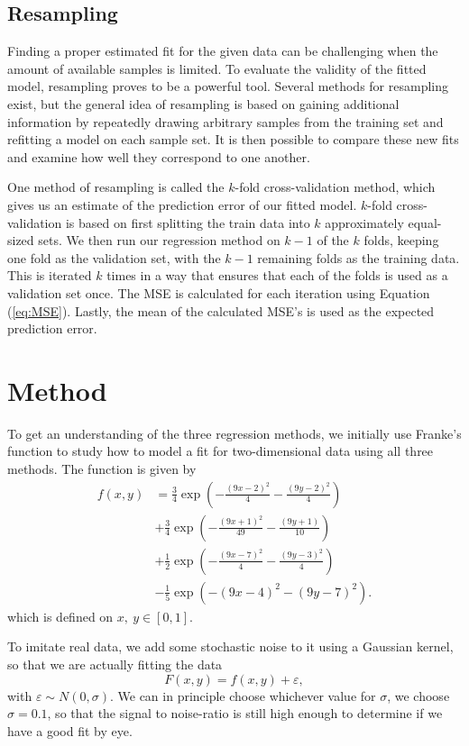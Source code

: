 \documentclass[a4paper, 10pt]{article}
\begin{document}
\begin{multicols}{2}
\subsection{Resampling}
Finding a proper estimated fit for the given data can be challenging when the amount of available samples is limited. To evaluate the validity of the fitted model, resampling proves to be a powerful tool. Several methods for resampling exist, but the general idea of resampling is based on gaining additional information by repeatedly drawing arbitrary samples from the training set and refitting a model on each sample set. It is then possible to compare these new fits and examine how well they correspond to one another.

One method of resampling is called the $k$-fold cross-validation method, which gives us an estimate of the prediction error of our fitted model. $k$-fold cross-validation is based on first splitting the train data into $k$ approximately equal-sized sets.  We then run our regression method on $k-1$ of the $k$ folds, keeping one fold as the validation set, with the $k-1$ remaining folds as the training data. This is iterated $k$ times in a way that ensures that each of the folds is used as a validation set once. The MSE is calculated for each iteration using Equation (\ref{eq:MSE}). Lastly, the mean of the calculated MSE's is used as the expected prediction error. 


\section{Method}
To get an understanding of the three regression methods, we initially use Franke's function to study how to model a fit for two-dimensional data using all three methods. The function is given by
\begin{align}
f(x,y) &= \frac{3}{4}\exp{\left(-\frac{(9x-2)^2}{4}   - \frac{(9y-2)^2}{4}\right)} \nonumber\\
 &+\frac{3}{4}\exp{\left(-\frac{(9x+1)^2}{49}- \frac{(9y+1)}{10}\right)} \nonumber\\
 &+\frac{1}{2}\exp{\left(-\frac{(9x-7)^2}{4} - \frac{(9y-3)^2}{4}\right)} \nonumber\\
 &-\frac{1}{5}\exp{\left(-(9x-4)^2 - (9y-7)^2\right) }. \label{eq:Franke}
\end{align} which is defined on $x,\ y \in [0,1]$.

To imitate real data, we add some stochastic noise to it using a Gaussian kernel, so that we are actually fitting the data 
\begin{equation}
F(x, y) = f(x, y) + \varepsilon \label{Franke noise},
\end{equation}
with $ \varepsilon \sim N(0, \sigma) $. We can in principle choose whichever value for $\sigma$, we choose $\sigma=0.1$, so that the signal to noise-ratio is still high enough to determine if we have a good fit by eye. 


\end{multicols}
\end{document}
